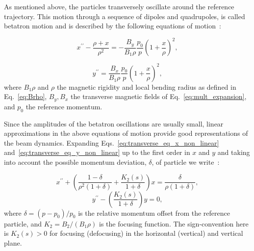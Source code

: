 As mentioned above, the particles transversely oscillate around the reference trajectory. This motion through a sequence of dipoles and quadrupoles, is called betatron motion and is described by the following equations of motion~\cite{Lee:1425444}: %

 \begin{equation}\label{eq:transverse_eq_x_non_linear}
   x^{\prime \prime} - \frac{\rho+x}{\rho^2} = - \frac{B_y}{B_1 \rho} \frac{p_0}{p} \left (  1+ \frac{x}{\rho} \right )^2, 
 \end{equation}

\begin{equation}\label{eq:transverse_eq_y_non_linear}
    y^{\prime \prime} = \frac{B_x}{B_1 \rho} \frac{p_0}{p}  \left (  1+ \frac{x}{\rho} \right )^2, 
\end{equation}
where $B_1 \rho$ and $\rho$ the magnetic rigidity and local bending radius as defined in Eq.~\eqref{eq:Brho},  $B_y, B_x$ the transverse magnetic fields of Eq.~\eqref{eq:mult_expansion}, and $p_0$ the reference momentum.

Since the amplitudes of the betatron oscillations are usually small, linear approximations in the above equations of motion provide good representations of the beam dynamics. Expanding Eqs.~\eqref{eq:transverse_eq_x_non_linear} and~\eqref{eq:transverse_eq_y_non_linear} up to the first order in $x$ and $y$ and taking into account the possible momentum deviation, $\delta$, of particle we write~\cite{Lee:1425444}: %

\begin{equation}\label{eq:eq_of_motion_horizontal_linear}
    x^{\prime \prime} + \left (  \frac{1-\delta}{\rho^2 (1+\delta)}  + \frac{K_2(s)}{1+\delta} \right )x = \frac{\delta}{\rho (1+\delta)}, 
\end{equation}
\begin{equation}\label{eq:eq_of_motion_vertical_linear}
    y^{\prime \prime} -  \left ( \frac{K_2(s)}{1+\delta} \right ) y = 0,
\end{equation}
where $\delta = (p-p_0)/p_0$ is the relative momentum offset from the reference particle, and $K_2=B_2 /(B_1\rho)$ is the focusing function. The sign-convention here is $K_2(s)>0$ for focusing (defocusing) in the horizontal (vertical) and vertical plane.

